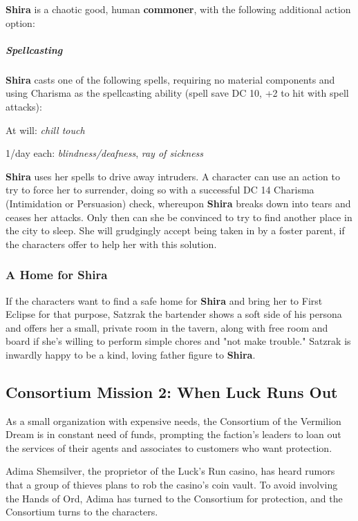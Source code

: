 \documentclass[10pt,a4paper,twoside,bg=print,twocolumn,openany,nodeprecatedcode]{dndbook}
\begin{document}
\textbf{Shira} is a chaotic good, human \textbf{commoner}, with the following additional action option:

\begin{DndSidebar}[float=!b]{}
\subparagraph{Spellcasting}
\textbf{Shira} casts one of the following spells, requiring no material components and using Charisma as the spellcasting ability (spell save DC 10, +2 to hit with spell attacks):

At will: \textit{chill touch}

1/day each: \textit{blindness/deafness}, \textit{ray of sickness}



\end{DndSidebar}

\textbf{Shira} uses her spells to drive away intruders. A character can use an action to try to force her to surrender, doing so with a successful DC 14 Charisma (Intimidation or Persuasion) check, whereupon \textbf{Shira} breaks down into tears and ceases her attacks. Only then can she be convinced to try to find another place in the city to sleep. She will grudgingly accept being taken in by a foster parent, if the characters offer to help her with this solution.

\subsubsection{A Home for Shira}
If the characters want to find a safe home for \textbf{Shira} and bring her to First Eclipse for that purpose, Satzrak the bartender shows a soft side of his persona and offers her a small, private room in the tavern, along with free room and board if she's willing to perform simple chores and "not make trouble." Satzrak is inwardly happy to be a kind, loving father figure to \textbf{Shira}.

\subsection{Consortium Mission 2: When Luck Runs Out}
As a small organization with expensive needs, the Consortium of the Vermilion Dream is in constant need of funds, prompting the faction's leaders to loan out the services of their agents and associates to customers who want protection.

Adima Shemsilver, the proprietor of the Luck's Run casino, has heard rumors that a group of thieves plans to rob the casino's coin vault. To avoid involving the Hands of Ord, Adima has turned to the Consortium for protection, and the Consortium turns to the characters.
\end{document}
